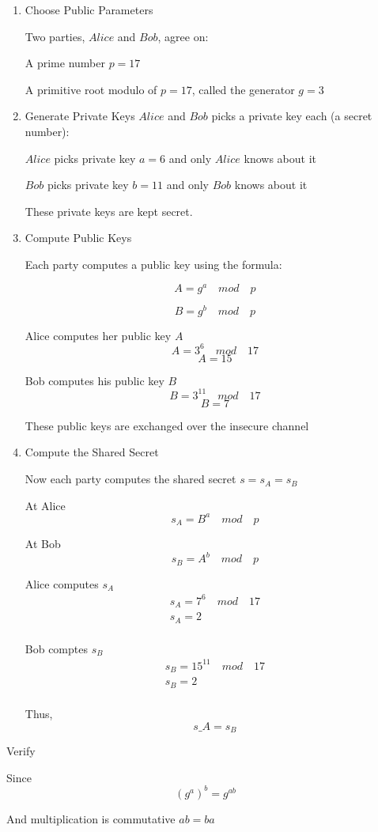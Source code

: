 \documentclass[a4paper, 9pt, english]{article}
\begin{document}
\begin{enumerate}
\item { Choose Public Parameters}

Two parties, $Alice$ and $Bob$, agree on:

A prime number $p =17 $

A primitive root modulo of $p = 17$, called the generator $g = 3$


\item { Generate Private Keys}
 $Alice$ and $Bob$ picks a private key each (a secret number):

 $Alice$ picks  private key $a = 6$ and only  $Alice$ knows about it
 
  $Bob$ picks  private key $b = 11$ and   only $Bob$ knows about it

These private keys are kept secret.

\item {Compute Public Keys}

Each party computes a public key using the formula:

\begin{equation}
A = g^a \quad mod \quad  p\label{eq:alice_public}
\end{equation}

\begin{equation}
B= g^b \quad mod  \quad p\label{eq:bob_public}
\end{equation}

Alice computes her public key $A$
$$A = 3^6 \quad mod \quad  17 $$
$$A = 15 $$

Bob computes his public key $B$
$$B = 3^{11} \quad mod \quad  17 $$
$$B = 7 $$

These public keys are exchanged over the insecure channel

\item { Compute the Shared Secret}

Now each party computes the shared secret $s = s_A = s_B$

At Alice
\begin{equation}
s_A= B^a \quad mod  \quad p\label{eq:alice_s_a}
\end{equation}

At Bob
\begin{equation}
s_B= A^b \quad mod  \quad p\label{eq:bob_s_b}
\end{equation}

Alice computes $s_A$
\begin{gather*}
    s_A = 7^6 \quad mod \quad 17\\
    s_A = 2\\
\end{gather*}

Bob comptes $s_B$
\begin{gather*}
    s_B = 15^{11} \quad mod \quad 17\\
    s_B = 2\\
\end{gather*}

Thus, \[s\_A = s_B \]

\end{enumerate}

{\Large Verify}

{\textsf Since } $$(g^a)^b = g^{ab}$$

\textsf{And multiplication is commutative} ${ab = ba}$


\end{document}

